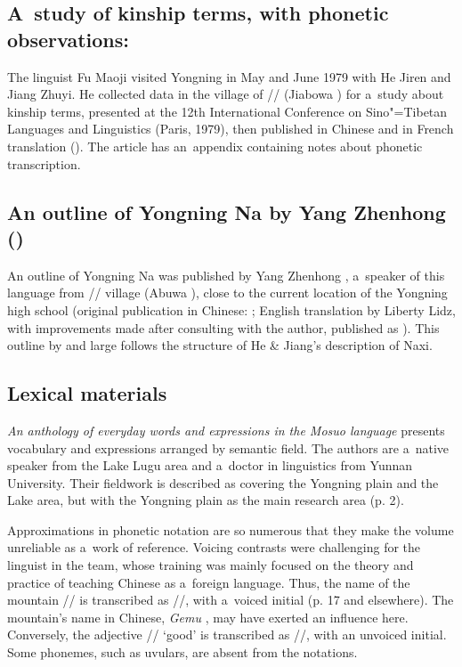 \subsection{A~study of kinship terms, with phonetic observations: \citet{fu1980}}
\label{sec:fu1980astudyofkinshipterms}

The linguist Fu Maoji  visited Yongning in May and June 1979 with He Jiren and Jiang Zhuyi. He collected data in the
village of // (Jiabowa ) for a~study about kinship terms, presented at the 12th International Conference on {Sino"=Tibetan} Languages and Linguistics (Paris,
1979), then published in Chinese and in {French} translation (\citealt{fu1980,fu1983}). The article has an~appendix containing notes about phonetic transcription. 

\subsection{An outline of Yongning Na by Yang Zhenhong (\citeyear{yang2009})}
\label{sec:yang2009}

An outline of Yongning Na was published by Yang Zhenhong , a~speaker of this language
from // village (Abuwa ), close to the current location of
the Yongning high school (original publication in Chinese: \citealt{yang2006d}; {English} translation
by Liberty Lidz, with improvements made after consulting with the author, published as \citealt{yang2009}). This outline by and large follows the structure of
He \& Jiang’s description of Naxi. 

\subsection{Lexical materials}
\label{sec:dictionary2013}

\textit{An anthology of everyday words and expressions in the Mosuo language} \citep{zhibaetal2013} presents vocabulary and expressions arranged by semantic field. The authors are a~native speaker from the Lake Lugu area and a~doctor in linguistics from Yunnan University. Their fieldwork is described as covering the Yongning plain and the Lake area, but with the Yongning plain as the main research area (p. 2). 

Approximations in phonetic notation are so numerous that they make the volume unreliable as a~work of reference. Voicing contrasts were challenging for the linguist in the team, whose training was mainly focused on the theory and practice of teaching Chinese as a~foreign language. Thus, the name of the mountain // is transcribed as //, with a~voiced initial (p. 17 and elsewhere). The mountain's name in Chinese, \textit{Gemu} , may have exerted an influence here. Conversely, the adjective // ‘good’ is transcribed as //, with an unvoiced initial. Some phonemes, such as uvulars, are absent from the notations. 

